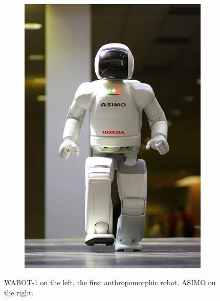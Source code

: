 \begin{figure}
\begin{subfigure}[b]{0.4\textwidth}
    \includegraphics[width=\textwidth]{figures/ASIMO.jpg}
    \caption{}
    \label{fig:asimo}
  \end{subfigure}
  \caption{WABOT-1 \cite{Kato1973TheWABOT1AI} on the left, the first 
      anthropomorphic robot. ASIMO \cite{Sakagami2002TheIntelligentASIMO} on
      the right.}
\end{figure}

